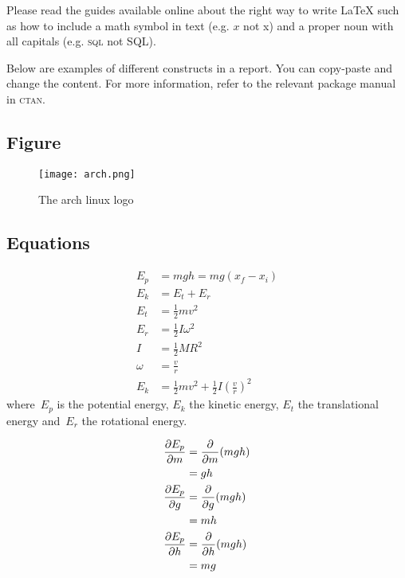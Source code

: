 \documentclass[../main.tex]{subfiles}
\begin{document}
Please read the guides available online about the right way
to write {\LaTeX} such as how to include a math symbol in
text (e.g. $x$ not x) and a proper noun with all capitals
(e.g. \textsc{sql} not SQL).

Below are examples of different constructs in a report. You
can copy-paste and change the content. For more information,
refer to the relevant package manual in \textsc{ctan}.

\subsection{Figure}

\begin{figure}[htb] 
    \centering
    \texttt{[image: arch.png]} 
    \caption{The arch linux logo} \label{fig:arch-linux} 
\end{figure}

\subsection{Equations}

\begin{align}
        E_p &= mgh = mg(x_f - x_i) \label{potential}
        \\
        E_k &= E_t + E_r \nonumber
        \\
        E_t &= \frac{1}{2} mv^2 \label{translational}
        \\
        E_r &= \frac{1}{2} I \omega^2 \label{rotational}
        \\
        I &= \frac{1}{2} M R^2 \label{inertia}
        \\
        \omega &= \frac{v}{r} \nonumber
        \\
        E_k &= \frac{1}{2} mv^2 +  \frac{1}{2} I \left( \frac{v}{r}\right) ^2 \label{kinetic}
\end{align}
where~$E_p$ is the potential energy, $E_k$ the kinetic
energy, $E_t$ the translational energy and~$E_r$
the rotational energy.

\begin{align*}
        \pdv{E_p}{m} &= \pdv{m}(mgh)
        \\
                          &= gh
                          \\
        \pdv{E_p}{g} &= \pdv{g}(mgh)
        \\
                          &= mh
        \\
        \pdv{E_p}{h} &= \pdv{h}(mgh)
        \\
                          &= mg
\end{align*}
\end{document}
